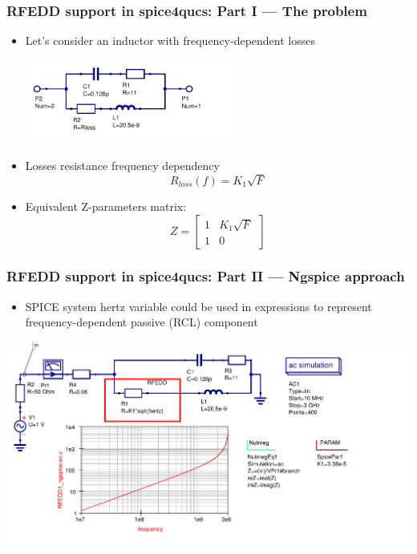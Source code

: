 \documentclass[9pt]{beamer}
\begin{document}
\begin{frame}
 \frametitle{RFEDD support in spice4qucs: Part I --- The problem}

\begin{itemize}
 \item Let's consider an inductor with frequency-dependent losses
 
 \includegraphics[width=7cm]{img/lossL.pdf}
 
 \item Losses resistance frequency dependency
 \begin{equation}
  R_{loss}(f) = K_1 \sqrt{F}
 \end{equation}
 \item Equivalent Z-parameters matrix:
 \begin{equation}
  Z = \left[
  \begin{matrix}1 & K_1\sqrt{F} \\ 1 & 0 \end{matrix}
  \,\right]
 \end{equation}

\end{itemize}

\end{frame}

\begin{frame}
\frametitle{RFEDD support in spice4qucs: Part II --- Ngspice approach}


\begin{itemize}
 \item SPICE system hertz variable could be used in expressions to represent 
frequency-dependent passive (RCL) component
\end{itemize}

\includegraphics[width=1.1\textwidth]{img/RFEDDsp.pdf}
\end{frame}
\end{document}
